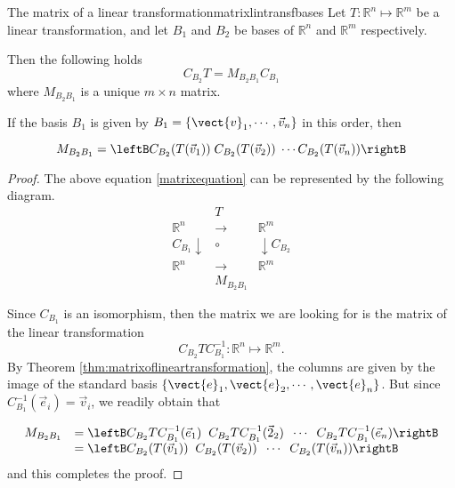 \begin{theorem}{The matrix of a linear transformation}{matrixlintransfbases}
Let $T: \mathbb{R}^n \mapsto \mathbb{R}^m$ be a linear transformation,
and let $B_1$ and $B_2$ be bases of $\mathbb{R}^{n}$ and
$\mathbb{R}^{m}$ respectively.

Then the following holds
\begin{equation}
C_{B_2} T = M_{B_{2} B_{1}} C_{B_1}   \label{matrixequation}
\end{equation}
where $M_{B_{2} B_{1}}$  is a unique  $m \times n$  matrix.

If the basis $B_1$ is given by $B_1=\{ \vect{v}_1, \cdots, \vec{v}_n \}$ in this order, then 

\[  M_{B_{2} B_{1}} = \leftB C_{B_2}(T(\vec{v}_1)) \; C_{B_2}(T(\vec{v}_2)) \; \cdots C_{B_2}(T(\vec{v}_n)) \rightB \]
\end{theorem}

\begin{proof}
The above equation \ref{matrixequation} can be represented by the following diagram.
\begin{equation*}
\begin{array}{rrcll}
&  & T &  &  \\
& \mathbb{R}^n & \rightarrow  & \mathbb{R}^m & \\
& C_{B_{1} }\downarrow  & \circ  & \downarrow C_{B_{2} } &  \\
& \mathbb{R}^{n} & \rightarrow  & \mathbb{R}^{m} &  \\
&  & M_{B_{2} B_{1} } &  &
\end{array}
\end{equation*}

Since $C_{B_1}$ is an isomorphism, then the matrix we are looking for is the matrix of the linear transformation 
\[   C_{B_2} T C^{-1}_{B_1} : \mathbb{R}^n \mapsto \mathbb{R}^m. \]
By Theorem \ref{thm:matrixoflineartransformation}, the columns are
given by the image of the standard basis $\left\{ \vect{e}_1,
\vect{e}_2, \cdots, \vect{e}_n \right\}$. But since $C^{-1}_{B_1}( \vec{e}_i) = \vec{v}_i$, we readily obtain that 

\[ \begin{array}{ll} 
M_{B_{2} B_{1}} 
& = \leftB C_{B_2}T C^{-1}_{B_1} (\vec{e}_1) \;\; C_{B_2}T C^{-1}_{B_1} (\vec{2}_2) \;\; \cdots \;\; C_{B_2}T C^{-1}_{B_1} (\vec{e}_n) \rightB \\
& = \leftB C_{B_2}(T(\vec{v}_1)) \;\; C_{B_2}(T(\vec{v}_2)) \;\; \cdots \;\; C_{B_2}(T(\vec{v}_n)) \rightB 
\end{array}\]
and this completes the proof. 
\end{proof}

